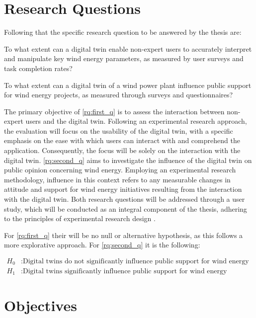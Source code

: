 \documentclass[11pt, titlepage, a4paper]{scrartcl}
\begin{document}
\begin{linenumbers}
    \section{Research Questions}
    Following that the specific research question to be answered by the thesis are:
    \begin{questions}
        \item \label{rq:first_q} To what extent can a digital twin enable non-expert users to accurately interpret and manipulate key wind energy parameters, as measured by user surveys and task completion rates?
        \item \label{rq:second_q} To what extent can a digital twin of a wind power plant influence public support for wind energy projects, as measured through surveys and questionnaires?
    \end{questions}
    The primary objective of \ref{rq:first_q} is to assess the interaction between non-expert users and the digital twin. Following an experimental research approach, the evaluation will focus on the usability of the digital twin, with a specific emphasis on the ease with which users can interact with and comprehend the application. Consequently, the focus will be solely on the interaction with the digital twin.
    \ref{rq:second_q} aims to investigate the influence of the digital twin on public opinion concerning wind energy. Employing an experimental research methodology, influence in this context refers to any measurable changes in attitude and support for wind energy initiatives resulting from the interaction with the digital twin.
    Both research questions will be addressed through a user study, which will be conducted as an integral component of the thesis, adhering to the principles of experimental research design \cite{lazarResearchMethodsHuman2017}.


    For \ref{rq:first_q} their will be no null or alternative hypothesis, as this follows a more explorative approach.
    For \ref{rq:second_q} it is the following:
 
    \begin{align}
        H_0 &: \text{Digital twins do not significantly influence public support for wind energy projects.} \\
        H_1 &: \text{Digital twins significantly influence public support for wind energy projects.}
        \end{align}


    \section{Objectives}

\end{linenumbers}
\end{document}
